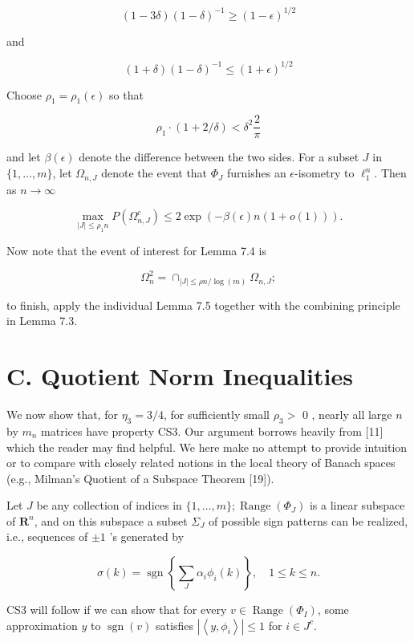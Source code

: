 \documentclass[10pt]{article}
\begin{document}
\begin{equation*}
(1-3 \delta)(1-\delta)^{-1} \geq(1-\epsilon)^{1 / 2} \tag{VII.2}
\end{equation*}


and


\begin{equation*}
(1+\delta)(1-\delta)^{-1} \leq(1+\epsilon)^{1 / 2} \tag{VII.3}
\end{equation*}


Choose $\rho_{1}=\rho_{1}(\epsilon)$ so that

$$
\rho_{1} \cdot(1+2 / \delta)<\delta^{2} \frac{2}{\pi}
$$

and let $\beta(\epsilon)$ denote the difference between the two sides. For a subset $J$ in $\{1, \ldots, m\}$, let $\Omega_{n, J}$ denote the event that $\Phi_{J}$ furnishes an $\epsilon$-isometry to $\ell_{1}^{n}$. Then as $n \rightarrow \infty$

$$
\max _{|J| \leq \rho_{1} n} P\left(\Omega_{n, J}^{c}\right) \leq 2 \exp (-\beta(\epsilon) n(1+o(1))) .
$$

Now note that the event of interest for Lemma 7.4 is

$$
\Omega_{n}^{2}=\cap_{|J| \leq \rho n / \log (m)} \Omega_{n, J} ;
$$

to finish, apply the individual Lemma 7.5 together with the combining principle in Lemma 7.3.

\section*{C. Quotient Norm Inequalities}
We now show that, for $\eta_{3}=3 / 4$, for sufficiently small $\rho_{3}>$ 0 , nearly all large $n$ by $m_{n}$ matrices have property CS3. Our argument borrows heavily from [11] which the reader may find helpful. We here make no attempt to provide intuition or to compare with closely related notions in the local theory of Banach spaces (e.g., Milman's Quotient of a Subspace Theorem [19]).

Let $J$ be any collection of indices in $\{1, \ldots, m\} ; \operatorname{Range}\left(\Phi_{J}\right)$ is a linear subspace of $\boldsymbol{R}^{n}$, and on this subspace a subset $\Sigma_{J}$ of possible sign patterns can be realized, i.e., sequences of $\pm 1$ 's generated by

$$
\sigma(k)=\operatorname{sgn}\left\{\sum_{J} \alpha_{i} \phi_{i}(k)\right\}, \quad 1 \leq k \leq n .
$$

CS3 will follow if we can show that for every $v \in \operatorname{Range}\left(\Phi_{I}\right)$, some approximation $y$ to $\operatorname{sgn}(v)$ satisfies $\left|\left\langle y, \phi_{i}\right\rangle\right| \leq 1$ for $i \in J^{c}$.
\end{document}
